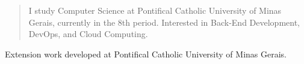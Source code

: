 \documentclass[10pt,a4paper,ragged2e,withhyper]{altacv}
\begin{document}
\begin{paracol}{2}

        
        
        
        
        
        \newpage
        
        \switchcolumn
        
            \begin{quote}
                I study Computer Science at Pontifical Catholic University of Minas Gerais, currently in the 8th period. Interested in Back-End Development, DevOps, and Cloud Computing.
            \end{quote}
        
            Extension work developed at Pontifical Catholic University of Minas Gerais.


\end{paracol}
\end{document}
